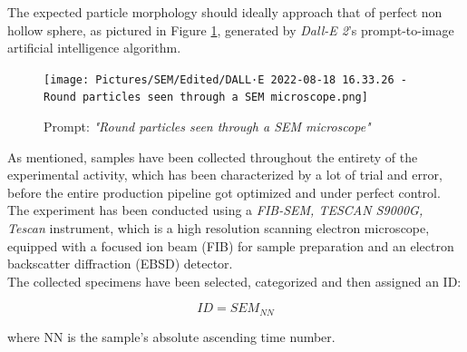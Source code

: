 \documentclass[a4paper]{article}
\begin{document}
        The expected particle morphology should ideally approach that of perfect non hollow sphere, as pictured in Figure \ref{fig:SEM_DALLE2}, generated by \textit{Dall-E 2}'s 
        prompt-to-image artificial intelligence algorithm. 

            \begin{figure}[ht]
                \centering
                \texttt{[image: Pictures/SEM/Edited/DALL·E 2022-08-18 16.33.26 - Round particles seen through a SEM microscope.png]}
                \caption{Prompt: \textit{"Round particles seen through a SEM microscope"}}
                \label{fig:SEM_DALLE2}
            \end{figure}

            \clearpage

            As mentioned, samples have been collected throughout the entirety of the experimental activity, which has been characterized by a lot of trial and error, 
            before the entire production pipeline got optimized and 
            under perfect control. \\ 

            The experiment has been conducted using a \textit{FIB-SEM, TESCAN S9000G, Tescan} instrument, which is a high resolution 
            scanning electron microscope, equipped with a focused ion beam (FIB) for sample preparation and 
            an electron backscatter diffraction (EBSD) detector. \\

            The collected specimens have been selected, categorized and then assigned an ID:

            \begin{equation}
                ID = SEM_{NN}
                \label{eq:SEM_ID}
            \end{equation}

            where NN is the sample's absolute ascending time number. \\ 


\end{document}
